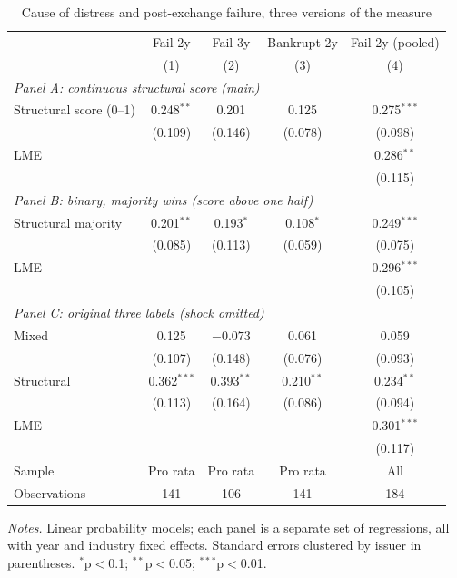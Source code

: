 \begin{table}[H]
\centering
\caption{Cause of distress and post-exchange failure, three versions of the measure}
\label{tab:reg_part1}
\small
\begin{tabular}{l c c c c}
\toprule
 & Fail 2y & Fail 3y & Bankrupt 2y & Fail 2y (pooled) \\
 & (1) & (2) & (3) & (4) \\
\midrule
\multicolumn{5}{l}{\textit{Panel A: continuous structural score (main)}} \\
\quad Structural score (0--1) & 0.248$^{**}$ & 0.201 & 0.125 & 0.275$^{***}$ \\
 & (0.109) & (0.146) & (0.078) & (0.098) \\
\quad LME &  &  &  & 0.286$^{**}$ \\
 &  &  &  & (0.115) \\
\multicolumn{5}{l}{\textit{Panel B: binary, majority wins (score above one half)}} \\
\quad Structural majority & 0.201$^{**}$ & 0.193$^{*}$ & 0.108$^{*}$ & 0.249$^{***}$ \\
 & (0.085) & (0.113) & (0.059) & (0.075) \\
\quad LME &  &  &  & 0.296$^{***}$ \\
 &  &  &  & (0.105) \\
\multicolumn{5}{l}{\textit{Panel C: original three labels (shock omitted)}} \\
\quad Mixed & 0.125 & $-0.073$ & 0.061 & 0.059 \\
 & (0.107) & (0.148) & (0.076) & (0.093) \\
\quad Structural & 0.362$^{***}$ & 0.393$^{**}$ & 0.210$^{**}$ & 0.234$^{**}$ \\
 & (0.113) & (0.164) & (0.086) & (0.094) \\
\quad LME &  &  &  & 0.301$^{***}$ \\
 &  &  &  & (0.117) \\
\midrule
Sample & Pro rata & Pro rata & Pro rata & All \\
Observations & 141 & 106 & 141 & 184 \\
\bottomrule
\end{tabular}
\begin{minipage}{0.95\textwidth}\vspace{4pt}\footnotesize
\textit{Notes.} Linear probability models; each panel is a separate set of regressions, all with year and industry fixed effects. Standard errors clustered by issuer in parentheses. $^{*}$p$<$0.1; $^{**}$p$<$0.05; $^{***}$p$<$0.01.
\end{minipage}
\end{table}
